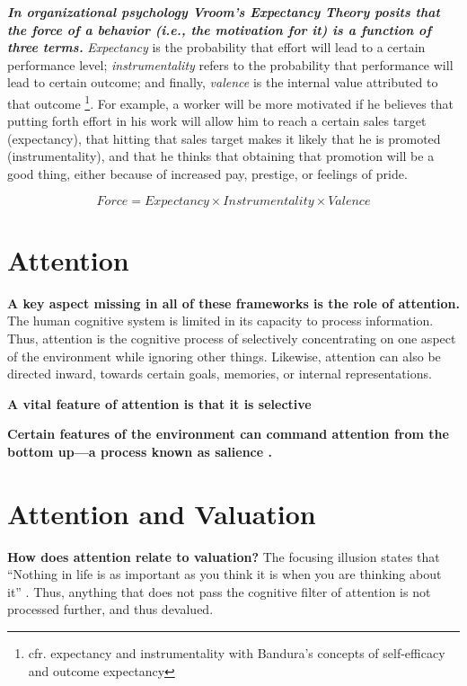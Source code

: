 \documentclass[letterpaper, 12pt]{article}
\begin{document}
\textbf{\textit{In organizational psychology Vroom's Expectancy Theory posits that the force of a behavior (i.e., the motivation for it) is a function of three terms.}} \textit{Expectancy} is the probability that effort will lead to a certain performance level; \textit{instrumentality} refers to the probability that performance will lead to certain outcome; and finally, \textit{valence} is the internal value attributed to that outcome \footnote{cfr. expectancy and instrumentality with Bandura's concepts of self-efficacy and outcome expectancy}. For example, a worker will be more motivated if he believes that putting forth effort in his work will allow him to reach a certain sales target (expectancy), that hitting that sales target makes it likely that he is promoted (instrumentality), and that he thinks that obtaining that promotion will be a good thing, either because of increased pay, prestige, or feelings of pride.

\begin{equation} \label{vroom}
    Force = Expectancy \times Instrumentality \times Valence
\end{equation}

\section*{Attention}

\textbf{A key aspect missing in all of these frameworks is the role of attention.} The human cognitive system is limited in its capacity to process information. Thus, attention is the cognitive process of selectively concentrating on one aspect of the environment while ignoring other things. Likewise, attention can also be directed inward, towards certain goals, memories, or internal representations.

\textbf{A vital feature of attention is that it is selective}

\textbf{Certain features of the environment can command attention from the bottom up—a process known as salience \cite{bordalo2022}.}

\section*{Attention and Valuation}

\textbf{How does attention relate to valuation?} The focusing illusion states that ``Nothing in life is as important as you think it is when you are thinking about it'' \cite[p. 402]{kahneman2011}. Thus, anything that does not pass the cognitive filter of attention is not processed further, and thus devalued. 
\end{document}
